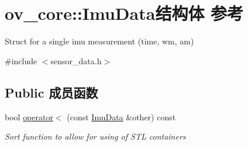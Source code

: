 \hypertarget{structov__core_1_1ImuData}{}\section{ov\+\_\+core\+:\+:Imu\+Data结构体 参考}
\label{structov__core_1_1ImuData}


Struct for a single imu measurement (time, wm, am)  




{\ttfamily \#include $<$sensor\+\_\+data.\+h$>$}

\subsection*{Public 成员函数}
\begin{DoxyCompactItemize}
\item 
\mbox{\label{structov__core_1_1ImuData_ac7c9b5b27b5a1fc4461571d3d4733b83}} 
bool \hyperlink{structov__core_1_1ImuData_ac7c9b5b27b5a1fc4461571d3d4733b83}{operator$<$} (const \hyperlink{structov__core_1_1ImuData}{Imu\+Data} \&other) const
\begin{DoxyCompactList}\small\item\em Sort function to allow for using of S\+TL containers \end{DoxyCompactList}\end{DoxyCompactItemize}
